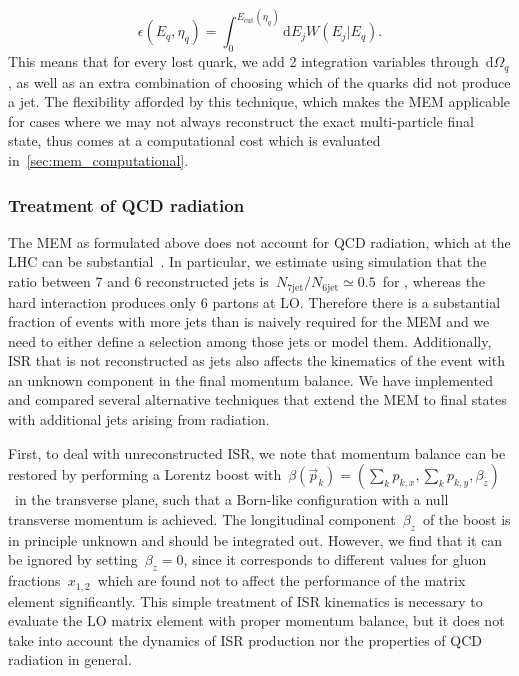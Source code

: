 \begin{equation}
\epsilon(E_q, \eta_q) = \int_0^{E_{\mathrm{cut}}(\eta_q)} \mathrm{d}E_j W(E_j | E_q).
\end{equation}
This means that for every lost quark, we add 2 integration variables through~$\mathrm{d}\Omega_q$, as well as an extra combination of choosing which of the quarks did not produce a jet. The flexibility afforded by this technique, which makes the MEM applicable for cases where we may not always reconstruct the exact multi-particle final state, thus comes at a computational cost which is evaluated in~\cref{sec:mem_computational}.

\subsubsection{Treatment of QCD radiation}
\label{sec:mem_radiation}

The MEM as formulated above does not account for QCD radiation, which at the LHC can be substantial~\cite{Alwall:2010cq}. In particular, we estimate using simulation that the ratio between 7 and 6 reconstructed jets is~$N_{7\mathrm{jet}}/N_{6\mathrm{jet}} \simeq 0.5$~for \ttHbb, whereas the hard interaction produces only 6 partons at LO. Therefore there is a substantial fraction of events with more jets than is naively required for the MEM and we need to either define a selection among those jets or model them. Additionally, ISR that is not reconstructed as jets also affects the kinematics of the event with an unknown component in the final momentum balance. We have implemented and compared several alternative techniques that extend the MEM to final states with additional jets arising from radiation.

First, to deal with unreconstructed ISR, we note that momentum balance can be restored by performing a Lorentz boost with~$\beta(\vec{p}_k) = (\sum_k p_{k,x}, \sum_k p_{k,y}, \beta_z)$~in the transverse plane, such that a Born-like configuration with a null transverse momentum is achieved. The longitudinal component~$\beta_z$~of the boost is in principle unknown and should be integrated out. However, we find that it can be ignored by setting~$\beta_z = 0$, since it corresponds to different values for gluon fractions~$x_{1,2}$~which are found not to affect the performance of the matrix element significantly. This simple treatment of ISR kinematics is necessary to evaluate the LO matrix element with proper momentum balance, but it does not take into account the dynamics of ISR production nor the properties of QCD radiation in general.

